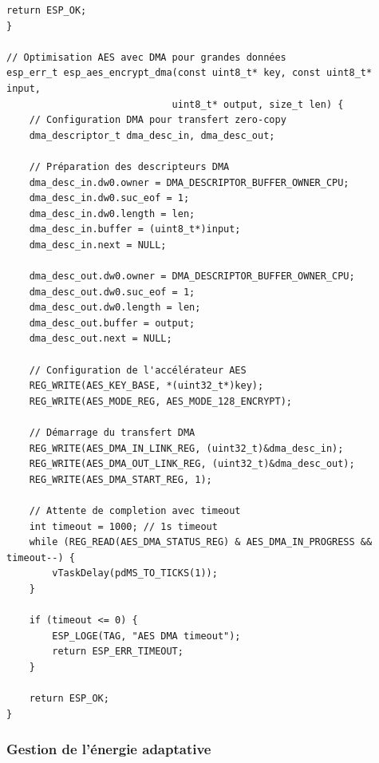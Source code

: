 \begin{lstlisting}[caption={Optimisations cryptographiques ESP32}]
    return ESP_OK;
}

// Optimisation AES avec DMA pour grandes données
esp_err_t esp_aes_encrypt_dma(const uint8_t* key, const uint8_t* input, 
                             uint8_t* output, size_t len) {
    // Configuration DMA pour transfert zero-copy
    dma_descriptor_t dma_desc_in, dma_desc_out;
    
    // Préparation des descripteurs DMA
    dma_desc_in.dw0.owner = DMA_DESCRIPTOR_BUFFER_OWNER_CPU;
    dma_desc_in.dw0.suc_eof = 1;
    dma_desc_in.dw0.length = len;
    dma_desc_in.buffer = (uint8_t*)input;
    dma_desc_in.next = NULL;
    
    dma_desc_out.dw0.owner = DMA_DESCRIPTOR_BUFFER_OWNER_CPU;
    dma_desc_out.dw0.suc_eof = 1;
    dma_desc_out.dw0.length = len;
    dma_desc_out.buffer = output;
    dma_desc_out.next = NULL;
    
    // Configuration de l'accélérateur AES
    REG_WRITE(AES_KEY_BASE, *(uint32_t*)key);
    REG_WRITE(AES_MODE_REG, AES_MODE_128_ENCRYPT);
    
    // Démarrage du transfert DMA
    REG_WRITE(AES_DMA_IN_LINK_REG, (uint32_t)&dma_desc_in);
    REG_WRITE(AES_DMA_OUT_LINK_REG, (uint32_t)&dma_desc_out);
    REG_WRITE(AES_DMA_START_REG, 1);
    
    // Attente de completion avec timeout
    int timeout = 1000; // 1s timeout
    while (REG_READ(AES_DMA_STATUS_REG) & AES_DMA_IN_PROGRESS && timeout--) {
        vTaskDelay(pdMS_TO_TICKS(1));
    }
    
    if (timeout <= 0) {
        ESP_LOGE(TAG, "AES DMA timeout");
        return ESP_ERR_TIMEOUT;
    }
    
    return ESP_OK;
}
\end{lstlisting}

\subsubsection{Gestion de l'énergie adaptative}

